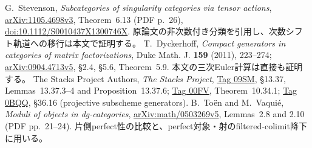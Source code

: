 G.~Stevenson, \emph{Subcategories of singularity categories via tensor actions},
\href{https://arxiv.org/abs/1105.4698v3}{arXiv:1105.4698v3},
Theorem~6.13 (PDF p.~26),
\href{https://doi.org/10.1112/S0010437X1300746X}{doi:10.1112/S0010437X1300746X}.
原論文の非次数付き分類を引用し、次数シフト軌道への移行は本文で証明する。
T.~Dyckerhoff, \emph{Compact generators in categories of matrix factorizations},
Duke Math. J. \textbf{159} (2011), 223--274;
\href{https://arxiv.org/abs/0904.4713v5}{arXiv:0904.4713v5},
\S2.4, \S5.6, Theorem~5.9. 本文の三次Euler計算は直接も証明する。
The Stacks Project Authors, \emph{The Stacks Project},
\href{https://stacks.math.columbia.edu/tag/09SM}{Tag 09SM},
\S13.37, Lemmas~13.37.3--4 and Proposition~13.37.6;
\href{https://stacks.math.columbia.edu/tag/00FV}{Tag 00FV}, Theorem~10.34.1;
\href{https://stacks.math.columbia.edu/tag/0BQQ}{Tag 0BQQ}, \S36.16 (projective subscheme generators).
B.~To\"en and M.~Vaqui\'e, \emph{Moduli of objects in dg-categories},
\href{https://arxiv.org/abs/math/0503269v5}{arXiv:math/0503269v5},
Lemmas~2.8 and 2.10 (PDF pp.~21--24).
片側perfect性の比較と、perfect対象・射のfiltered-colimit降下に用いる。

